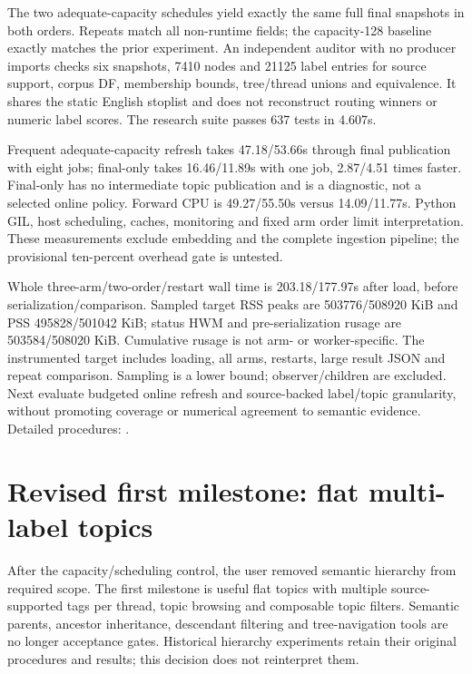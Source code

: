 \documentclass[11pt]{article}
\begin{document}
The two adequate-capacity schedules yield exactly the same full final snapshots
in both orders. Repeats match all non-runtime fields; the capacity-128 baseline
exactly matches the prior experiment. An independent auditor with no producer
imports checks six snapshots, 7410 nodes and 21125 label entries for source
support, corpus DF, membership bounds, tree/thread unions and equivalence.
It shares the static English stoplist and does not reconstruct routing winners
or numeric label scores. The research suite passes 637 tests in 4.607s.

Frequent adequate-capacity refresh takes 47.18/53.66s through final publication
with eight jobs; final-only takes 16.46/11.89s with one job, 2.87/4.51 times
faster. Final-only has no intermediate topic publication and is a diagnostic,
not a selected online policy. Forward CPU is 49.27/55.50s versus 14.09/11.77s.
Python GIL, host scheduling, caches, monitoring and fixed arm order limit
interpretation. These measurements exclude embedding and the complete ingestion
pipeline; the provisional ten-percent overhead gate is untested.

Whole three-arm/two-order/restart wall time is 203.18/177.97s after load,
before serialization/comparison. Sampled target RSS peaks are 503776/508920 KiB
and PSS 495828/501042 KiB; status HWM and pre-serialization rusage are
503584/508020 KiB. Cumulative rusage is not arm- or worker-specific. The
instrumented target includes loading, all arms, restarts, large result JSON and
repeat comparison. Sampling is a lower bound; observer/children are excluded.
Next evaluate budgeted online refresh and source-backed label/topic granularity,
without promoting coverage or numerical agreement to semantic evidence.
Detailed procedures: .

\section{Revised first milestone: flat multi-label topics}
After the capacity/scheduling control, the user removed semantic hierarchy from
required scope. The first milestone is useful flat topics with multiple
source-supported tags per thread, topic browsing and composable topic filters.
Semantic parents, ancestor inheritance, descendant filtering and tree-navigation
tools are no longer acceptance gates. Historical hierarchy experiments retain
their original procedures and results; this decision does not reinterpret them.
\end{document}
